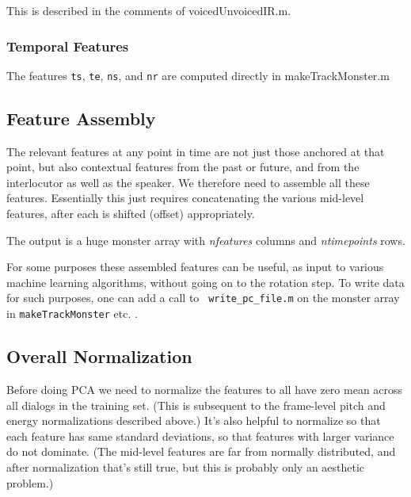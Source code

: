 \documentclass[11pt]{article}
\begin{document}
This is described in the comments of voicedUnvoicedIR.m.

\subsubsection{Temporal Features}

The features {\tt ts}, {\tt te}, {\tt ns}, and {\tt nr} are computed
directly in makeTrackMonster.m

\subsection{Feature Assembly}

The relevant features at any point in time are not just those anchored
at that point, but also contextual features from the past or future,
and from the interlocutor as well as the speaker.  We therefore need
to assemble all these features.  Essentially this just requires
concatenating the various mid-level features, after each is shifted
(offset) appropriately.

The output is a huge monster array with {\it nfeatures} columns and
{\it ntimepoints} rows.

For some purposes these assembled features can be useful, as input to
various machine learning algorithms, without going on to the rotation
step.  To write data for such purposes, one can add a call to {\tt
  write\_pc\_file.m} on the monster array in {\tt makeTrackMonster}
etc. .


\subsection{Overall Normalization}

Before doing PCA we need to normalize the features to all have zero
mean across all dialogs in the training set.  (This is subsequent to
the frame-level pitch and energy normalizations described above.)
It's also helpful to normalize so that each feature has same standard
deviations, so that features with larger variance do not dominate.
(The mid-level features are far from normally distributed, and after
normalization that's still true, but this is probably only an
aesthetic problem.)

\end{document}
